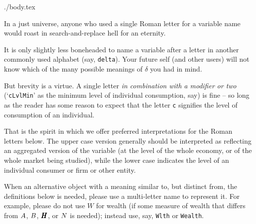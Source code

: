 \documentclass{econtex}
\begin{document}
\begin{verbatimwrite}{./body.tex}

In a just universe, anyone who used a single Roman letter for a variable name would roast in search-and-replace hell for an eternity.

It is only slightly less boneheaded to name a variable after a letter in another commonly used alphabet (say, \texttt{delta}).  Your future self (and other users) will not know which of the many possible meanings of $\delta$ you had in mind.

But brevity is a virtue.  A single letter {\it in combination with a modifier or two} (`\texttt{cLvlMin}' as the minimum level of individual consumption, say) is fine -- so long as the reader has some reason to expect that the letter \texttt{c} signifies the level of consumption of an individual.  

That is the spirit in which we offer preferred interpretations for the Roman letters below.  The upper case 
version generally should be interpreted as reflecting an aggregated version of the variable (at the level of the whole economy, or of the whole market being studied), while the lower case indicates the level of an individual consumer or firm or other entity.

When an alternative object with a meaning similar to, but distinct from, the definitions below is needed, please use a multi-letter name to represent it.  For example, please do not use $W$ for wealth (if some measure of wealth that differs from $A$, $B$, $\pmb{H}$, or $N$ is needed); instead use, say, \texttt{Wlth} or \texttt{Wealth}. 

\pagebreak


\end{verbatimwrite}
\end{document}

